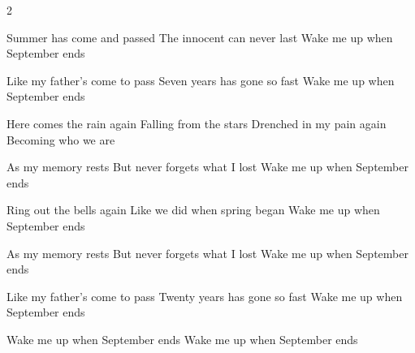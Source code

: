 \vspace*{0.07\textheight}

\begin{paracol}{2}
\begin{guitar}
	\begin{highlightbar}
    Summer has come and passed
    The innocent can never last
    Wake me up when September ends
  \end{highlightbar}

	\songsection{Verse 1}
  Like my father's come to pass
  Seven years has gone so fast
  Wake me up when September ends

  \begin{slimhighlightbar}
    Here comes the rain again
    Falling from the stars
    Drenched in my pain again
    Becoming who we are
  \end{slimhighlightbar}

	\songsection{Verse 2}
  As my memory rests
  But never forgets what I lost
  Wake me up when September ends

	\begin{highlightbar}
  \end{highlightbar}

	\songsection{Verse 3}
  Ring out the bells again
  Like we did when spring began
  Wake me up when September ends

  \begin{slimhighlightbar}
  \end{slimhighlightbar}
\end{guitar}

\switchcolumn

\begin{guitar}
  As my memory rests
  But never forgets what I lost
  Wake me up when September ends

	\begin{highlightbar}
  \end{highlightbar}

  Like my father's come to pass
  Twenty years has gone so fast
  Wake me up when September ends

  Wake me up when September ends
  Wake me up when September ends
\end{guitar}
\end{paracol}
